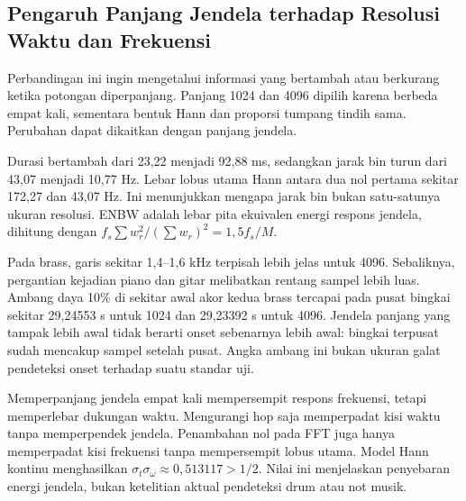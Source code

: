 \subsection{Pengaruh Panjang Jendela terhadap Resolusi Waktu dan Frekuensi}
Perbandingan ini ingin mengetahui informasi yang bertambah atau
berkurang ketika potongan diperpanjang. Panjang 1024 dan 4096 dipilih
karena berbeda empat kali, sementara bentuk Hann dan proporsi
tumpang tindih sama. Perubahan dapat dikaitkan dengan panjang jendela.
\begin{table}[H]
\centering\small
\caption{Parameter pada $f_s=44\,100$ Hz; overlap keduanya 75\%.}
\label{tab:jendela}

\end{table}
Durasi bertambah dari 23,22 menjadi 92,88 ms, sedangkan jarak bin
turun dari 43,07 menjadi 10,77 Hz. Lebar lobus utama Hann antara
dua nol pertama sekitar 172,27 dan 43,07 Hz. Ini menunjukkan
mengapa jarak bin bukan satu-satunya ukuran resolusi.
ENBW adalah lebar pita ekuivalen energi respons jendela, dihitung
dengan $f_s\sum w_r^2/(\sum w_r)^2=1,5f_s/M$.

Pada brass, garis sekitar 1,4--1,6 kHz terpisah lebih jelas untuk
4096. Sebaliknya, pergantian kejadian piano dan gitar melibatkan
rentang sampel lebih luas. Ambang daya 10\% di sekitar awal akor
kedua brass tercapai pada pusat bingkai sekitar 29,24553 s untuk
1024 dan 29,23392 s untuk 4096. Jendela panjang yang tampak lebih
awal tidak berarti onset sebenarnya lebih awal: bingkai terpusat
sudah mencakup sampel setelah pusat. Angka ambang ini bukan ukuran
galat pendeteksi onset terhadap suatu standar uji.

Memperpanjang jendela empat kali mempersempit respons frekuensi,
tetapi memperlebar dukungan waktu. Mengurangi hop saja memperpadat
kisi waktu tanpa memperpendek jendela. Penambahan nol pada FFT juga
hanya memperpadat kisi frekuensi tanpa mempersempit lobus utama.
Model Hann kontinu menghasilkan
$\sigma_t\sigma_\omega\approx0,513117>1/2$. Nilai ini menjelaskan
penyebaran energi jendela, bukan ketelitian aktual pendeteksi drum
atau not musik.

